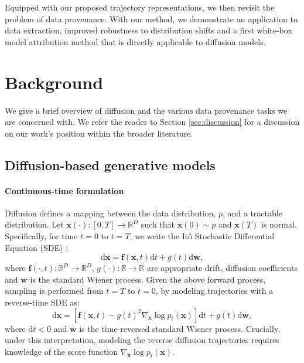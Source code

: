\documentclass{article}
\theoremstyle{remark}
\begin{document}
Equipped with our proposed trajectory representations, we then revisit the problem of data provenance. With our method, we demonstrate an application to data extraction, improved robustness to distribution shifts and a first white-box model attribution method that is directly applicable to diffusion models.

\section{Background}

We give a brief overview of diffusion and the various data provenance tasks we are concerned with. We refer the reader to Section \ref{sec:discussion} for a discussion on our work's position within the broader literature.

\subsection{Diffusion-based generative models}

\paragraph{Continuous-time formulation}
Diffusion defines a mapping between the data distribution, $p$, and a tractable distribution. Let $\boldsymbol{x}(\cdot):[0, T]\to\mathbb{R}^D$ such that $\boldsymbol{x}(0)\sim p$ and $\boldsymbol{x}(T)$ is normal. Specifically, for time $t=0$ to $t=T$, we write the It\^{o} Stochastic Differential Equation (SDE) \citep{song2021scorebased}:
\begin{equation}
    \label{eq:fwdito}
    \text{d}\boldsymbol{x}=\boldsymbol{f}(\boldsymbol{x}, t)\text{d}t+g(t)\text{d}\boldsymbol{w},
\end{equation}
where $\boldsymbol{f}(\cdot,t):\mathbb{R}^D\to\mathbb{R}^D$, $g(\cdot):\mathbb{R}\to\mathbb{R}$ are appropriate drift, diffusion coefficients and $\boldsymbol{w}$ is the standard Wiener process. Given the above forward process, sampling is performed from $t=T$ to $t=0$, by modeling trajectories with a reverse-time SDE \citep{ANDERSON1982313} as:
\begin{equation}
    \label{eq:revito}
    \text{d}\boldsymbol{x}=[\boldsymbol{f}(\boldsymbol{x}, t) - g(t)^2\nabla_{\boldsymbol{x}}\log p_t(\boldsymbol{x})]\text{d}t + g(t)\text{d}\bar{\boldsymbol{w}},
\end{equation}
where $\text{d}t<0$ and $\bar{\boldsymbol{w}}$ is the time-reversed standard Wiener process. Crucially, under this interpretation, modeling the reverse diffusion trajectories requires knowledge of the score function $\nabla_{\boldsymbol{x}}\log p_t(\boldsymbol{x})$.
\end{document}
